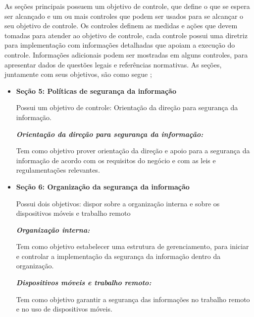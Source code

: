 As seções principais possuem um objetivo de controle, que define o que se espera ser alcançado e um ou mais controles que podem ser usados para se alcançar o seu objetivo de controle. Os controles definem as medidas e ações que devem tomadas para atender ao objetivo de controle, cada controle possui uma diretriz para implementação com informações detalhadas que apoiam a execução do controle. Informações adicionais podem ser mostradas em alguns controles, para apresentar dados de questões legais e referências normativas. As seções, juntamente com seus objetivos, são como segue \cite{ISO27002};

\begin{itemize}
  \item \textbf{Seção 5: Políticas de segurança da informação}
  
    Possui um objetivo de controle: Orientação da direção para segurança da informação.
    
\textit{     \textbf{Orientação da direção para segurança da informação:} }
     
     Tem como objetivo prover orientação da direção e apoio para a segurança da informação de acordo com os requisitos do negócio e com as leis e regulamentações relevantes.
  \end{itemize}
\begin{itemize}
    \item \textbf{Seção 6: Organização da segurança da informação} 
    
    Possui dois objetivos: dispor sobre a  organização interna e sobre os dispositivos móveis e trabalho remoto
    
   \textit{ \textbf{Organização interna:} }
    
    Tem como objetivo estabelecer uma estrutura de gerenciamento, para iniciar e controlar a implementação da segurança da informação dentro da organização.
    
  \textit{  \textbf{Dispositivos móveis e trabalho remoto:}}
    
    Tem como objetivo garantir a segurança das informações no trabalho remoto e no uso de dispositivos móveis.
    
\end{itemize}
